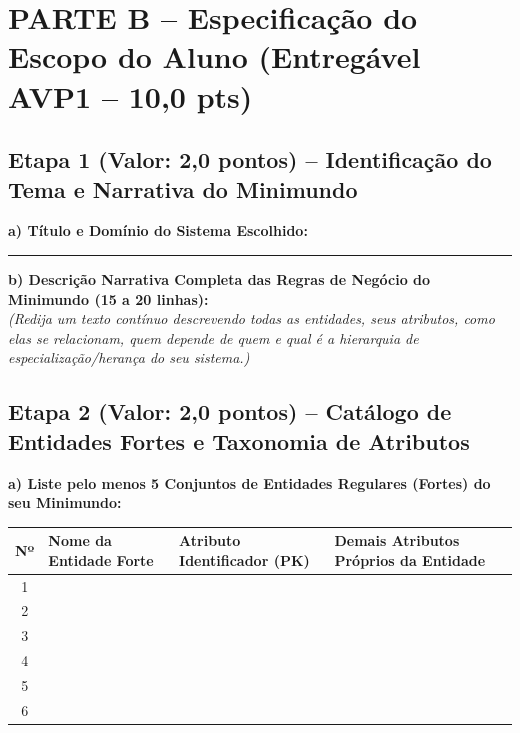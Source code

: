 \documentclass[11pt,a4paper]{article}
\newcommand{\linhaescrita}{\noindent\textcolor{black!40}{\rule{\linewidth}{0.4pt}}\par\vspace{0.28cm}}
\begin{document}
\section*{PARTE B -- Especificação do Escopo do Aluno (Entregável AVP1 -- 10,0 pts)}

\subsection*{Etapa 1 (Valor: 2,0 pontos) -- Identificação do Tema e Narrativa do Minimundo}
\textbf{a) Título e Domínio do Sistema Escolhido:} \\[0.2cm]
\linhaescrita

\vspace{0.05cm}
\noindent\textbf{b) Descrição Narrativa Completa das Regras de Negócio do Minimundo (15 a 20 linhas):} \\
{\footnotesize\textit{(Redija um texto contínuo descrevendo todas as entidades, seus atributos, como elas se relacionam, quem depende de quem e qual é a hierarquia de especialização/herança do seu sistema.)}}

\vspace{0.1cm}
\noindent\fbox{\parbox{\dimexpr\textwidth-2\fboxsep-2\fboxrule\relax}{%
\vspace{0.2cm}
\linhaescrita
\linhaescrita
\linhaescrita
\linhaescrita
\linhaescrita
\linhaescrita
\linhaescrita
\linhaescrita
\linhaescrita
\linhaescrita
\noindent\textcolor{black!40}{\rule{\linewidth}{0.4pt}}\par\vspace{0.12cm}
}}

\newpage

\subsection*{Etapa 2 (Valor: 2,0 pontos) -- Catálogo de Entidades Fortes e Taxonomia de Atributos}

\textbf{a) Liste pelo menos 5 Conjuntos de Entidades Regulares (Fortes) do seu Minimundo:}

\vspace{0.15cm}
\noindent
{\renewcommand{\arraystretch}{1.85}
\begin{tabularx}{\textwidth}{|c|p{3.8cm}|p{3.2cm}|X|}
\hline
\textbf{Nº} & \textbf{Nome da Entidade Forte} & \textbf{Atributo Identificador (PK)} & \textbf{Demais Atributos Próprios da Entidade} \\
\hline
1 & & & \\
\hline
2 & & & \\
\hline
3 & & & \\
\hline
4 & & & \\
\hline
5 & & & \\
\hline
6 & & & \\
\hline
\end{tabularx}}
\end{document}
